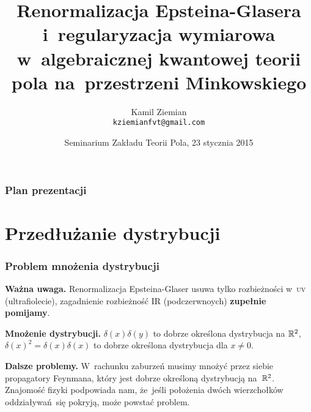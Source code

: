 \documentclass[10pt,t]{beamer}
\title{Renormalizacja Epsteina-Glasera i~regularyzacja
  wymiarowa w~algebraicznej kwantowej teorii pola na~przestrzeni
  Minkowskiego}
\author{Kamil Ziemian \\
  \texttt{kziemianfvt@gmail.com}}
\institute{Uniwersytet Jagielloński w~Krakowie}
\date[23 I 2015]{Seminarium Zakładu Teorii Pola, 23 stycznia 2015}
\begin{document}





\RaggedRight





\maketitle





\begin{frame}
  \frametitle{Plan prezentacji}


  \tableofcontents %

\end{frame}










\section{Przedłużanie dystrybucji}



\begin{frame}
  \frametitle{Problem mnożenia dystrybucji}


  \textbf{Ważna uwaga.}
  Renormalizacja Epsteina-Glaser usuwa tylko rozbieżności w~\textsc{uv}
  (ultrafiolecie), zagadnienie rozbieżność IR (podczerwnoych)
  \textbf{zupełnie pomijamy}.

  \VerSpaceFour





  \textbf{Mnożenie dystrybucji.}
  $\delta( x ) \delta( y )$ to dobrze określona dystrybucja na $\mathbb{R}^{ 2 }$, \\
  $\delta( x )^{ 2 } = \delta( x ) \delta( x )$ to dobrze określona dystrybucja dla $x \neq 0$.

  \VerSpaceFour





  \textbf{Dalsze problemy.}
  W~rachunku zaburzeń musimy mnożyć przez siebie propagatory Feynmana,
  który jest dobrze określoną dystrybucją na~$\mathbb{R}^{ 2 }$. Znajomość fizyki
  podpowiada nam, że~jeśli położenia dwóch wierzchołków
  oddziaływań~się pokryją, może powstać problem.

\end{frame}
\end{document}
